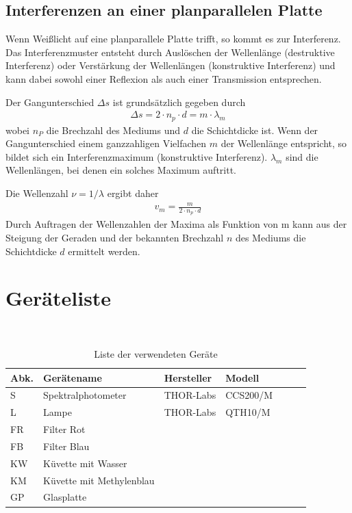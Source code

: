 \documentclass{article}
\begin{document}
\subsection{Interferenzen an einer planparallelen Platte}


Wenn Weißlicht auf eine planparallele Platte trifft, so kommt es zur Interferenz. Das Interferenzmuster entsteht durch Auslöschen der Wellenlänge (destruktive Interferenz) oder Verstärkung der Wellenlängen (konstruktive Interferenz) und kann dabei sowohl einer Reflexion als auch einer Transmission entsprechen.

Der Gangunterschied $\Delta s$ ist grundsätzlich gegeben durch
\begin{align}
\Delta s  = 2\cdot n_p\cdot d = m\cdot\lambda_m
\end{align}
wobei $n_P$ die Brechzahl des Mediums und $d$ die Schichtdicke ist. Wenn der Gangunterschied einem ganzzahligen Vielfachen $m$ der Wellenlänge entspricht, so bildet sich ein Interferenzmaximum (konstruktive Interferenz). $\lambda_m$ sind die Wellenlängen, bei denen ein solches Maximum auftritt.

Die Wellenzahl $\nu = 1/\lambda$ ergibt daher
\begin{align}
v_m = \frac{m}{2\cdot n_p\cdot d}
\end{align}
Durch Auftragen der Wellenzahlen der Maxima als Funktion von m kann aus der Steigung der Geraden und der bekannten Brechzahl $n$ des Mediums die Schichtdicke $d$ ermittelt werden.





\section{Geräteliste}

\begin{table}[H]
\caption{Liste der verwendeten Geräte}

~

\begin{tabular}{l|p{3cm}p{3.5cm}llll}
Abk. & Gerätename    & Hersteller & Modell  \\
\hline
S & Spektralphotometer & THOR-Labs & CCS200/M \\
L & Lampe & THOR-Labs & QTH10/M \\
FR & Filter Rot & \\
FB & Filter Blau & \\
KW & Küvette mit Wasser &\\
KM & Küvette mit Methylenblau \\
GP & Glasplatte
\end{tabular}
\end{table}
\end{document}
